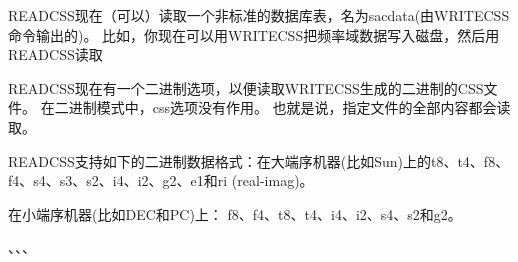 READCSS现在（可以）读取一个非标准的数据库表，名为sacdata(由WRITECSS命令输出的)。%
比如，你现在可以用WRITECSS把频率域数据写入磁盘，然后用READCSS读取

READCSS现在有一个二进制选项，以便读取WRITECSS生成的二进制的CSS文件。
在二进制模式中，css选项没有作用。
也就是说，指定文件的全部内容都会读取。

READCSS支持如下的二进制数据格式：在大端序机器(比如Sun)上的t8、t4、f8、f4、s4、s3、s2、i4、i2、g2、e1和ri (real-imag)。

在小端序机器(比如DEC和PC)上： f8、f4、t8、t4、i4、i2、s4、s2和g2。

、、、%
